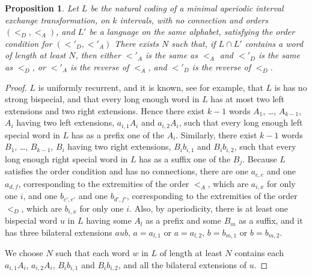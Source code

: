 \documentclass[12pt,a4paper]{amsart}
\newtheorem{proposition}[theorem]{Proposition}
\begin{document}
\begin{proposition}\label{2ord}  Let $L$ be the natural coding of a minimal aperiodic interval exchange transformation, on $k$ intervals, with no connection and orders $(<_D,<_A)$, and $L'$ be a language on the same alphabet, satisfying the order condition for  $(<'_D,<'_A)$ There exists $N$ such that, if $L\cap L'$ contains a word of length at least $N$,  then either $<'_A$ is the same as $<_A$ and 
$<'_D$ is the same as $<_D$, or $<'_A$ is the reverse of  $<_A$, and $<'_D$ is the reverse of  $<_D$.
\end{proposition} 
\begin{proof} $L$ is uniformly recurrent, and it is known, see \cite{fhuz} for example, that $L$ is has no strong bispecial, and that every long enough word in $L$ has at most  two left extensions and two right extensions. Hence there exist  $k-1$ words $A_1$, \ldots , $A_{k-1}$, $A_i$ having two left extensions, $a_{i,1}A_i$ and $a_{i,2}A_i$, such that every long enough  left special word in $L$ has as a prefix one of the $A_i$.  Similarly, there exist $k-1$ words $B_1$, \ldots , $B_{k-1}$, $B_i$ having two right extensions, $B_ib_{i,1}$ and $B_ib_{i,2}$, such that every long enough  right special word in $L$ has as a suffix one of the $B_j$. Because $L$ satisfies the order condition and  has no connections, there are one $a_{c,e}$ and one $a_{d,f}$, corresponding to the extremities of the order $<_A$, which are $a_{i,x}$ for only one $i$, and one $b_{c',e'}$ and one $b_{d',f'}$, corresponding to the extremities of the order $<_D$, which are $b_{i,x}$ for only one $i$. Also, by aperiodicity, there is at least one bispecial word  $u$ in $L$ having some $A_l$ as a prefix and some $B_m$ as a suffix, and it has three bilateral extensions $aub$, $a=a_{l,1}$ or $a=a_{l,2}$, $b=b_{m,1}$ or $b=b_{m,2}$.

 We choose $N$ such that each word $w$ in $L$ of length at least $N$ contains each $a_{i,1}A_i$, $a_{i,2}A_i$, $B_ib_{i,1}$ and $B_ib_{i,2}$, and  all the bilateral extensions of $u$.
 

\end{proof}
\end{document}
